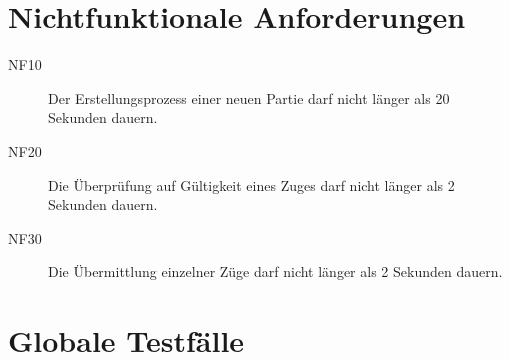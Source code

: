 \documentclass[parskip=full]{scrartcl}
\begin{document}
\section{Nichtfunktionale Anforderungen}
\begin{description}
	
	\item[NF10] Der Erstellungsprozess einer neuen Partie darf nicht länger als 20 Sekunden dauern.
	\item[NF20] Die Überprüfung auf Gültigkeit eines Zuges darf nicht länger als 2 Sekunden dauern.
	\item[NF30] Die Übermittlung einzelner Züge darf nicht länger als 2 Sekunden dauern.
	
\end{description}
\section{Globale Testfälle}
\end{document}
